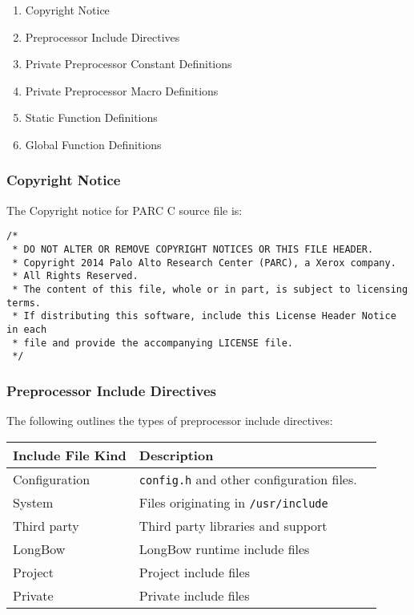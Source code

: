 \documentclass[fleqn,12pt]{PARCOneColumn} %
\begin{document}
\begin{enumerate}
\item Copyright Notice
\item Preprocessor Include Directives
\item Private Preprocessor Constant Definitions
\item Private Preprocessor Macro Definitions
\item Static Function Definitions
\item Global Function Definitions
\end{enumerate}

\subsubsection{Copyright Notice}
The Copyright notice for PARC C source file is:

\begin{lstlisting}[caption=The PARC Copyright Notice]
/*
 * DO NOT ALTER OR REMOVE COPYRIGHT NOTICES OR THIS FILE HEADER.
 * Copyright 2014 Palo Alto Research Center (PARC), a Xerox company.
 * All Rights Reserved.
 * The content of this file, whole or in part, is subject to licensing terms.
 * If distributing this software, include this License Header Notice in each
 * file and provide the accompanying LICENSE file.
 */
\end{lstlisting}

\subsubsection{Preprocessor Include Directives}

The following outlines the types of preprocessor include directives:

\begin{tabular}{llr}
\toprule
Include File Kind  & Description \\
\midrule
Configuration & {\tt config.h} and other configuration files. \\
System	      & Files originating in {\tt /usr/include} \\
Third party   & Third party libraries and support \\
LongBow       & LongBow runtime include files \\
Project       & Project include files \\
Private       & Private include files \\
\bottomrule
\end{tabular}
\end{document}
